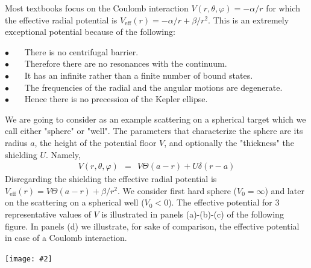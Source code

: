 \documentclass[onecolumn,fleqn, 11pt]{revtex4}
\newcommand{\tbox}[1]{\text{#1}}
\newcommand{\bitem}{$\bullet$ \ \ \ }
\newcommand{\putgraph}[2][0.30\hsize]{\texttt{[image: \#2]}}
\newcommand{\beq}{\begin{eqnarray}}
\newcommand{\eeq}{\end{eqnarray}}
\begin{document}
Most textbooks focus on the Coulomb interaction
${V(r,\theta,\varphi)=-\alpha/r}$
for which the effective radial potential 
is ${ V_{\tbox{eff}}(r) = -\alpha/r + \beta/r^2 }$.
This is an extremely exceptional potential 
because of the following: 

\bitem There is no centrifugal barrier. \\
\bitem Therefore there are no resonances with the continuum. \\
\bitem It has an infinite rather than a finite number of bound states. \\
\bitem The frequencies of the radial and the angular motions are degenerate. \\
\bitem Hence there is no precession of the Kepler ellipse.


We are going to consider as an example 
scattering on a spherical target 
which we call either "sphere" or "well".
The parameters that characterize the sphere 
are its radius $a$, the height of the 
potential floor $V$, and optionally 
the "thickness" the shielding $U$. Namely, 
\beq
V(r,\theta,\varphi) \ \ = \ \ V \Theta(a-r) + U\delta(r-a)
\eeq
Disregarding the shielding the effective radial potential 
is ${ V_{\tbox{eff}}(r) = V\Theta(a-r) + \beta/r^2 }$.
We consider first hard sphere ($V_0=\infty$) and later 
on the scattering on a spherical well ($V_0<0$).
The effective potential for 3 representative  
values of $V$ is illustrated in panels (a)-(b)-(c) 
of the following figure. In panels (d) we illustrate,  
for sake of comparison, the effective potential 
in case of a Coulomb interaction.   


\begin{center}
\putgraph[0.7\hsize]{EffectivePotential}
\end{center}
\end{document}
